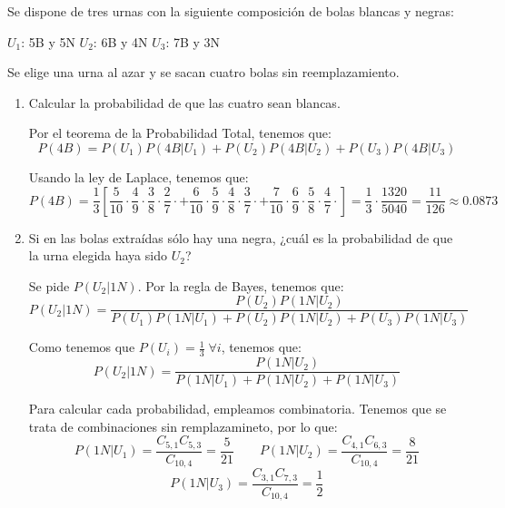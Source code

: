 \begin{ejercicio} \label{ej:4.Ejercicio7}
    Se dispone de tres urnas con la siguiente composición de bolas blancas y negras:
    \begin{center}
        $U_1$: 5B y 5N
        \qquad
        $U_2$: 6B y 4N
        \qquad
        $U_3$: 7B y 3N
    \end{center}

    Se elige una urna al azar y se sacan cuatro bolas sin reemplazamiento.
    \begin{enumerate}
        \item Calcular la probabilidad de que las cuatro sean blancas.

        Por el teorema de la Probabilidad Total, tenemos que:
        \begin{equation*}
            P(4B) = P(U_1)P(4B|U_1) + P(U_2)P(4B|U_2) + P(U_3)P(4B|U_3)
        \end{equation*}

        Usando la ley de Laplace, tenemos que:
        \begin{equation*}
            P(4B) = \frac{1}{3}\left[
            \frac{5}{10}\cdot \frac{4}{9}\cdot \frac{3}{8}\cdot \frac{2}{7}\cdot 
            +
            \frac{6}{10}\cdot \frac{5}{9}\cdot \frac{4}{8}\cdot \frac{3}{7}\cdot 
            +
            \frac{7}{10}\cdot \frac{6}{9}\cdot \frac{5}{8}\cdot \frac{4}{7}\cdot 
            \right] = \frac{1}{3}\cdot \frac{1320}{5040} = \frac{11}{126} \approx 0.0873
        \end{equation*}
        
        \item Si en las bolas extraídas sólo hay una negra, ¿cuál es la probabilidad de que la urna elegida haya sido $U_2$?

        Se pide $P(U_2|1N)$. Por la regla de Bayes, tenemos que:
        \begin{equation*}
            P(U_2|1N) = \frac{P(U_2)P(1N|U_2)}{P(U_1)P(1N|U_1) + P(U_2)P(1N|U_2) + P(U_3)P(1N|U_3)}
        \end{equation*}

        Como tenemos que $P(U_i)=\frac{1}{3}\;\forall i$, tenemos que:
        \begin{equation*}
            P(U_2|1N) = \frac{P(1N|U_2)}{P(1N|U_1) + P(1N|U_2) + P(1N|U_3)}
        \end{equation*}

        Para calcular cada probabilidad, empleamos combinatoria. Tenemos que se trata de combinaciones sin remplazamineto, por lo que:
        \begin{equation*}
            P(1N|U_1) = \frac{C_{5,1}C_{5,3}}{C_{10, 4}} = \frac{5}{21}
            \qquad
            P(1N|U_2) = \frac{C_{4,1}C_{6,3}}{C_{10, 4}} = \frac{8}{21}
        \end{equation*}
        \begin{equation*}
            P(1N|U_3) = \frac{C_{3,1}C_{7,3}}{C_{10, 4}} = \frac{1}{2}
        \end{equation*}


\end{enumerate}
\end{ejercicio}
